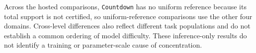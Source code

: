 Across the hosted comparisons, \texttt{Countdown} has no uniform reference because its
total support is not certified, so uniform-reference comparisons use the other
four domains. Cross-level differences
also reflect different task populations and do not establish a common ordering
of model difficulty. These inference-only results do not identify a training
or parameter-scale cause of concentration.
